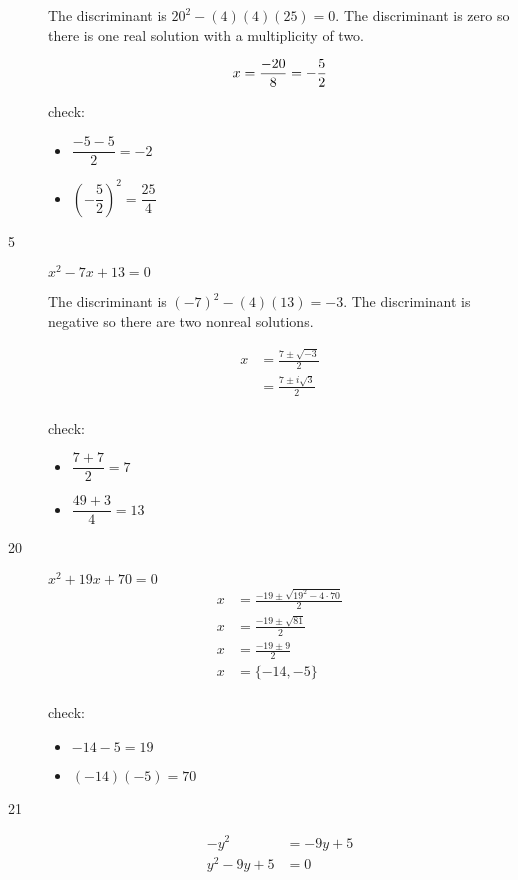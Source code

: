 \documentclass[fleqn,addpoints]{exam}
\begin{document}
\begin{description}
The discriminant is \( 20^2 - (4)(4)(25) = 0 \).  The discriminant is zero so there is one real solution with a
multiplicity of two. 

\[
  x = \frac{-20}{8} = - \frac{5}{2}\\
\]

check:
\begin{itemize}
  \item \( \dfrac{-5-5}{2} = -2 \)
  \item \( \left( - \dfrac{5}{2} \right)^2 = \dfrac{25}{4} \)
\end{itemize}

\item[5] \( x^2 - 7x + 13 = 0 \)

The discriminant is \( (-7)^2 - (4)(13) = -3\).  The discriminant is negative so there are two nonreal solutions.

\begin{align*}
  x &= \frac{7 \pm \sqrt{-3}}{2} \\
  &= \frac{7 \pm i \sqrt{3}}{2} \\
\end{align*}

check:
\begin{itemize}
  \item \( \dfrac{7+7}{2} = 7\)
  \item \( \dfrac{49 + 3}{4} = 13 \)
\end{itemize}

\item[20] \( x^2 + 19x + 70 = 0 \)
\begin{align*}
  x &= \frac{-19 \pm \sqrt{19^2 - 4 \cdot 70}}{2} \\
  x &= \frac{-19 \pm \sqrt{81}}{2} \\
  x &= \frac{-19 \pm 9}{2} \\
  x &= \{-14, -5 \} \\
\end{align*}

check:
\begin{itemize}
  \item \( -14-5=19 \)
  \item \( (-14)(-5) = 70 \)
\end{itemize}

\item[21] 
\begin{align*}
  -y^2 &= -9y + 5 \\
  y^2 - 9y + 5 &= 0 \\
\end{align*}


\end{description}
\end{document}
